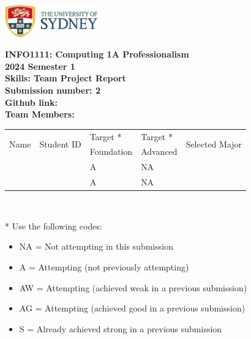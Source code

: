 \documentclass[a4paper, 11pt]{report}
\begin{document}
\begin{titlepage}
\begin{flushright}
\includegraphics[width=4cm]{USyd}\\[1cm]
\end{flushright}

\begin{centering}
\textbf{\huge INFO1111: Computing 1A Professionalism}\\[0.75cm]
\textbf{\huge 2024 Semester 1}\\[2cm]
\textbf{\huge Skills: Team Project Report}\\[2cm]

\textbf{\large Submission number: 2}\\[0.5cm]
\textbf{\large Github link:}\\[0.75cm]
\textbf{\huge Team Members:}\\[0.75cm]

\begin{tabular}{|p{}|p{}|p{}|p{}|p{}|}
	\hline
	\multirow{2}{*}{Name} & \multirow{2}{*}{Student ID} & Target * & Target * & \multirow{2}{*}{Selected Major} \\
	 & & Foundation & Advanced & \\
	\hline
	\hline
	\raggedright{\studB} & \sidB & A & NA & \majB \\
	\hline
	\raggedright{\studC} & \sidC & A & NA & \majC \\
	\hline
\end{tabular}
\\[0.5cm]
\end{centering}

* Use the following codes:
\begin{itemize}
\setlength\itemsep{0em}
\item NA = Not attempting in this submission
\item A = Attempting (not previously attempting)
\item AW = Attempting (achieved weak in a previous submission) 
\item AG = Attempting (achieved good in a previous submission)
\item S = Already achieved strong in a previous submission
\end{itemize}

\thispagestyle{empty}
\end{titlepage}
\end{document}

